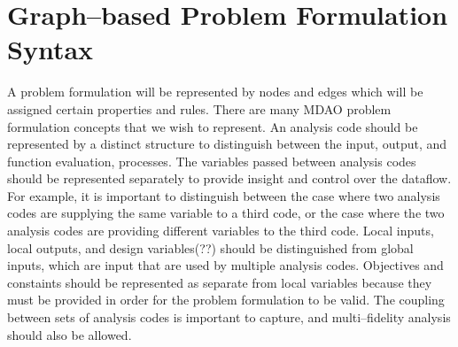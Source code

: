 \section{Graph--based Problem Formulation Syntax}
A problem formulation will be represented by nodes and edges which will be assigned certain properties and rules. There are many MDAO problem formulation concepts that we wish to represent. An analysis code should be represented by a distinct structure to distinguish between the input, output, and function evaluation, processes. The variables passed between analysis codes should be represented separately to provide insight and control over the dataflow. For example, it is important to distinguish between the case where two analysis codes are supplying the same variable to a third code, or the case where the two analysis codes are providing different variables to the third code. 
Local inputs, local outputs, and design variables(??) should be distinguished from global inputs, which are input that are used by multiple analysis codes.
Objectives and constaints should be represented as separate from local variables because they must be provided in order for the problem formulation to be valid. The coupling between sets of analysis codes is important to capture, and multi--fidelity analysis should also be allowed.


